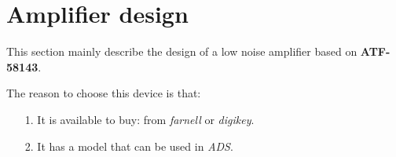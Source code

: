 \documentclass[12pt,a4paper]{report}
\begin{document}
\chapter{Amplifier design}
This section mainly describe the design of a low noise amplifier based on \textbf{ATF-58143}. 

The reason to choose this device is that:
\begin{itemize}
    \item[1.] It is available to buy: from \emph{farnell} or \emph{digikey}.
    \item[2.] It has a model that can be used in \emph{ADS}.
\end{itemize}



\end{document}
